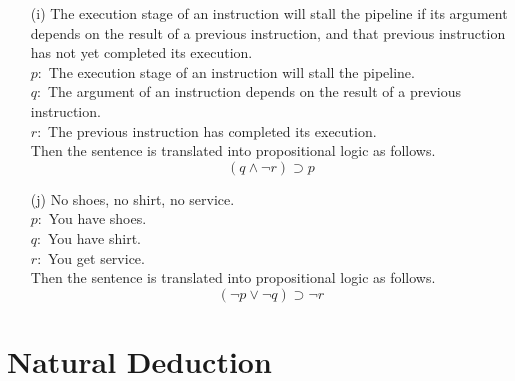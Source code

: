 \documentclass[12pt]{article}
\begin{document}
\begin{itemize}
	\item[(i)]
		The execution stage of an instruction will stall the pipeline if its argument depends on the result of a previous instruction, and that previous instruction has not yet completed its execution. \\
		$p:$ The execution stage of an instruction will stall the pipeline. \\
		$q:$ The argument of an instruction depends on the result of a previous instruction. \\
		$r:$ The previous instruction has completed its execution. \\
		Then the sentence is translated into propositional logic as follows. \\
		\[
			(q \land \neg r) \supset p
		\]
		
	\item[(j)]
		No shoes, no shirt, no service.\\
		$p:$ You have shoes. \\
		$q:$ You have shirt. \\
		$r:$ You get service. \\
		Then the sentence is translated into propositional logic as follows. \\
		\[
			(\neg p \lor \neg q) \supset \neg r
		\]
		
\end{itemize}


\section{Natural Deduction}
\end{document}
